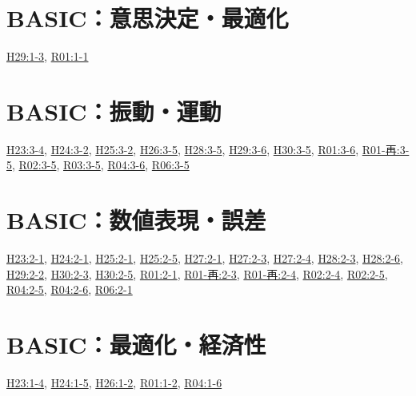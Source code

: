 \section{BASIC：意思決定・最適化}
\hyperref[q:h29-reg-basic-1-3]{H29:1-3}, \hyperref[q:r01-reg-basic-1-1]{R01:1-1}
\section{BASIC：振動・運動}
\hyperref[q:h23-reg-basic-3-4]{H23:3-4}, \hyperref[q:h24-reg-basic-3-2]{H24:3-2}, \hyperref[q:h25-reg-basic-3-2]{H25:3-2}, \hyperref[q:h26-reg-basic-3-5]{H26:3-5}, \hyperref[q:h28-reg-basic-3-5]{H28:3-5}, \hyperref[q:h29-reg-basic-3-6]{H29:3-6}, \hyperref[q:h30-reg-basic-3-5]{H30:3-5}, \hyperref[q:r01-reg-basic-3-6]{R01:3-6}, \hyperref[q:r01-ret-basic-3-5]{R01-再:3-5}, \hyperref[q:r02-reg-basic-3-5]{R02:3-5}, \hyperref[q:r03-reg-basic-3-5]{R03:3-5}, \hyperref[q:r04-reg-basic-3-6]{R04:3-6}, \hyperref[q:r06-reg-basic-3-5]{R06:3-5}
\section{BASIC：数値表現・誤差}
\hyperref[q:h23-reg-basic-2-1]{H23:2-1}, \hyperref[q:h24-reg-basic-2-1]{H24:2-1}, \hyperref[q:h25-reg-basic-2-1]{H25:2-1}, \hyperref[q:h25-reg-basic-2-5]{H25:2-5}, \hyperref[q:h27-reg-basic-2-1]{H27:2-1}, \hyperref[q:h27-reg-basic-2-3]{H27:2-3}, \hyperref[q:h27-reg-basic-2-4]{H27:2-4}, \hyperref[q:h28-reg-basic-2-3]{H28:2-3}, \hyperref[q:h28-reg-basic-2-6]{H28:2-6}, \hyperref[q:h29-reg-basic-2-2]{H29:2-2}, \hyperref[q:h30-reg-basic-2-3]{H30:2-3}, \hyperref[q:h30-reg-basic-2-5]{H30:2-5}, \hyperref[q:r01-reg-basic-2-1]{R01:2-1}, \hyperref[q:r01-ret-basic-2-3]{R01-再:2-3}, \hyperref[q:r01-ret-basic-2-4]{R01-再:2-4}, \hyperref[q:r02-reg-basic-2-4]{R02:2-4}, \hyperref[q:r02-reg-basic-2-5]{R02:2-5}, \hyperref[q:r04-reg-basic-2-5]{R04:2-5}, \hyperref[q:r04-reg-basic-2-6]{R04:2-6}, \hyperref[q:r06-reg-basic-2-1]{R06:2-1}
\section{BASIC：最適化・経済性}
\hyperref[q:h23-reg-basic-1-4]{H23:1-4}, \hyperref[q:h24-reg-basic-1-5]{H24:1-5}, \hyperref[q:h26-reg-basic-1-2]{H26:1-2}, \hyperref[q:r01-reg-basic-1-2]{R01:1-2}, \hyperref[q:r04-reg-basic-1-6]{R04:1-6}
